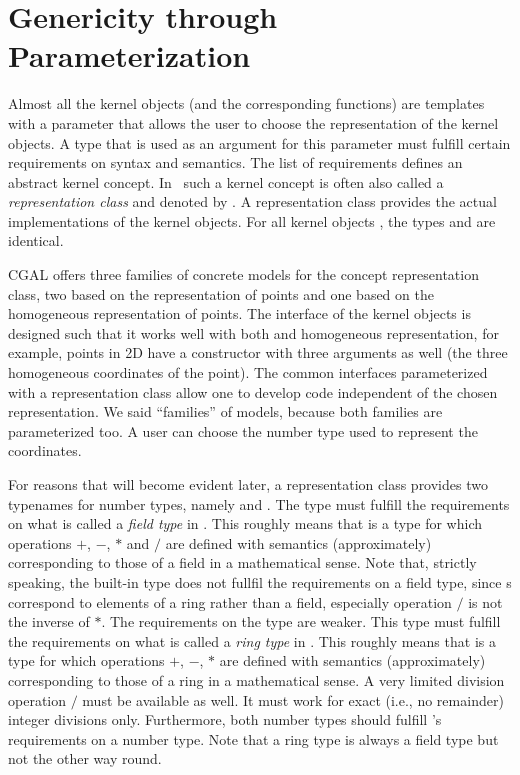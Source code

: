 \section{Genericity through Parameterization}
Almost all the kernel objects (and the corresponding functions) are
templates with a parameter that allows the user to choose the
representation of the kernel objects. A type that is used as an
argument for this parameter must fulfill certain requirements on 
syntax and semantics. The list of requirements defines an abstract
kernel concept. In \cgal\ such a kernel concept is often also called 
a \emph{representation class} and denoted by . A representation 
class provides the actual implementations of the kernel objects.
For all kernel objects , the types 
 and  are identical.

CGAL offers three families of concrete models for the concept
representation class, two based on the  representation of points
and one based on the homogeneous representation of points. 
The interface of the kernel objects is designed such that it works well
with both  and homogeneous representation, for example, points
in 2D have a constructor with three arguments as well
(the three homogeneous coordinates of the point).
The common interfaces parameterized with a representation class allow
one to develop code independent of the chosen representation. 
We said ``families'' of models, because both families are parameterized too.
A user can choose the number type used to represent the coordinates.

For reasons that will become evident later,
a representation class provides two typenames for number types, 
namely  and .%
The type  must fulfill the requirements on what is 
called a {\em field type} in \cgal. This roughly means that  
is a type for which  operations $+$, $-$, $*$ and $/$ are defined
with semantics (approximately) corresponding to those of a field in 
a mathematical sense. Note that, strictly speaking, the built-in type 
 does not fullfil the requirements on a field type, since s
correspond to elements of a ring rather than a field, especially 
operation $/$ is not the inverse of $*$.
The requirements on the type  are weaker.
This type must fulfill the requirements on what is called a {\em ring type}
in \cgal. This roughly means that  
is a type for which  operations $+$, $-$, $*$ are defined with semantics
(approximately) corresponding to those of a ring in a mathematical sense. 
A very limited division operation $/$ must be available as well.
It must work for exact (i.e., no remainder) integer divisions only.
Furthermore, both number types should fulfill \cgal's requirements on a
number type. %
Note that a ring type is always a field type but not the other way 
round.

